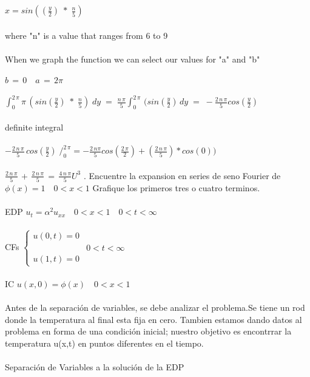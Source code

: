 \documentclass[10pt,a4paper]{report}
\begin{document}
\\\\ $\displaystyle x=sin((\frac{y}{2}) \; * \; \frac{n}{5}) $
\\\\ where "n" is a value that ranges from 6 to 9
\\\\ When we graph the function we can select our values for "a" and "b"
\\\\ $\displaystyle b \, = \, 0 \quad  a \, = \, 2\pi$
\\\\ $\displaystyle \int_0^{2 \, \pi}\pi \, (sin(\frac{y}{2}) \; * \; \frac{n}{5}) \; dy \; = \; \frac{n \, \pi}{5} \int_0^{2 \, \pi} \, (sin(\frac{y}{2}) \, dy \; = \; - \frac{2 \, n \, \pi}{5} cos(\frac{y}{2})$
\\\\ definite integral
\\\\ $\displaystyle - \frac{2 \, n \, \pi}{5} \, cos(\frac{y}{2}) \; /_0^{2 \, \pi} = - \frac{2 \, n \pi}{5} cos(\frac{2 \, \pi}{2}) + ( \frac{2 \, n \, \pi}{5}) * cos (0)) $
\\\\ $\displaystyle \frac{2 \, n \, \pi}{5} \, + \, \frac{2 \, n \, \pi}{5} \, = \, \frac{4 \, n \, \pi}{5} U^3$
. Encuentre la expansion en series de seno Fourier de $\phi(x) = 1 \quad 0<x<1$ Grafique los primeros tres o cuatro terminos.
\\\\ EDP \quad$u_t = \alpha^2 u_{xx} \quad 0<x<1 \quad 0<t<\infty$
\\\\ CFs $
\left \{ \begin{matrix}
u(0,t) = 0 
\\
& {0 < t < \infty}
\\
u(1,t)= 0 

\end{matrix} \right. $
\\\\ IC \quad $u(x,0) = \phi(x) \quad 0<x<1$
\\\\ Antes de la separación de variables, se debe analizar el problema.Se tiene un rod donde la temperatura al final esta fija en cero. Tambien estamos dando datos al problema en forma de una condición inicial; nuestro objetivo es encontrrar la temperatura u(x,t) en puntos diferentes en el tiempo.
\\\\ Separación de Variables a la solución de la EDP
\end{document}
